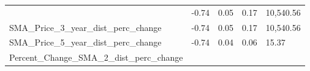 \documentclass[]{article}
\begin{document}
\begin{longtable}[]{@{}lllll@{}}
\begin{minipage}[t]{0.49\columnwidth}
\end{minipage} & \begin{minipage}[t]{0.08\columnwidth}\raggedright\strut
-0.74\strut
\end{minipage} & \begin{minipage}[t]{0.09\columnwidth}\raggedright\strut
0.05\strut
\end{minipage} & \begin{minipage}[t]{0.09\columnwidth}\raggedright\strut
0.17\strut
\end{minipage} & \begin{minipage}[t]{0.11\columnwidth}\raggedright\strut
10,540.56\strut
\end{minipage}\tabularnewline
\begin{minipage}[t]{0.49\columnwidth}\raggedright\strut
SMA\_Price\_3\_year\_dist\_perc\_change\strut
\end{minipage} & \begin{minipage}[t]{0.08\columnwidth}\raggedright\strut
-0.74\strut
\end{minipage} & \begin{minipage}[t]{0.09\columnwidth}\raggedright\strut
0.05\strut
\end{minipage} & \begin{minipage}[t]{0.09\columnwidth}\raggedright\strut
0.17\strut
\end{minipage} & \begin{minipage}[t]{0.11\columnwidth}\raggedright\strut
10,540.56\strut
\end{minipage}\tabularnewline
\begin{minipage}[t]{0.49\columnwidth}\raggedright\strut
SMA\_Price\_5\_year\_dist\_perc\_change\strut
\end{minipage} & \begin{minipage}[t]{0.08\columnwidth}\raggedright\strut
-0.74\strut
\end{minipage} & \begin{minipage}[t]{0.09\columnwidth}\raggedright\strut
0.04\strut
\end{minipage} & \begin{minipage}[t]{0.09\columnwidth}\raggedright\strut
0.06\strut
\end{minipage} & \begin{minipage}[t]{0.11\columnwidth}\raggedright\strut
15.37\strut
\end{minipage}\tabularnewline
\begin{minipage}[t]{0.49\columnwidth}\raggedright\strut
Percent\_Change\_SMA\_2\_dist\_perc\_change\strut

\end{minipage}
\end{longtable}
\end{document}
